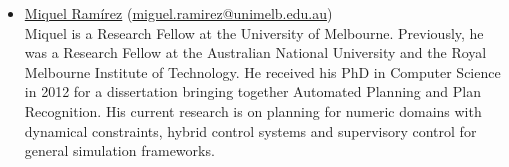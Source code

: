 \documentclass[10pt]{article}
\begin{document}
\begin{itemize}
%
\item \href{http://findanexpert.unimelb.edu.au/display/person778610#tab-overview}{Miquel Ram\'{i}rez}
  (\href{mailto:miguel.ramirez@unimelb.edu.au}{miguel.ramirez@unimelb.edu.au})\\
Miquel is a Research Fellow at the University of Melbourne. Previously, he was
a Research Fellow at the Australian National University and the Royal Melbourne
Institute of Technology. He
received his PhD in Computer Science in 2012 for a dissertation
bringing together Automated Planning and Plan Recognition. His current
research is on planning for numeric domains with dynamical constraints, hybrid control 
systems and supervisory control for general simulation frameworks.






\end{itemize}
\end{document}
